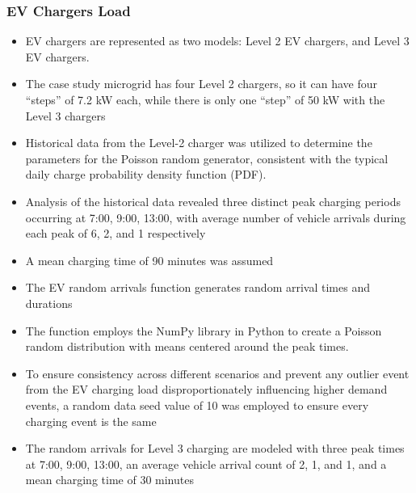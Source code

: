\documentclass[aspectratio=169, 8 pt]{beamer}
\begin{document}
	\begin{frame}
		\frametitle{EV Chargers Load}
		
		\begin{itemize} \large
			\item EV chargers are represented as two models: Level 2 EV chargers, and Level 3 EV chargers.
			\item The case study microgrid has four Level 2 chargers, so it can have four “steps” of 7.2 kW each, while there is only one “step” of 50 kW with the Level 3 chargers
			\item Historical data from the Level-2 charger was utilized to determine the parameters for the Poisson random generator, consistent with the typical daily charge probability density function (PDF).
			\item Analysis of the historical data revealed three distinct peak charging periods occurring at 7:00, 9:00, 13:00, with average number of vehicle arrivals during each peak of 6, 2, and 1 respectively
			\item A mean charging time of 90 minutes was assumed
			\item The EV random arrivals function generates random arrival times and durations
			\item The function employs the NumPy library in Python to create a Poisson random distribution with means centered around the peak times.
			\item To ensure consistency across different scenarios and prevent any outlier event from the EV charging load disproportionately influencing higher demand events, a random data seed value of 10 was employed to ensure every charging event is the same
			\item The random arrivals for Level 3 charging are modeled with three peak times at 7:00, 9:00, 13:00, an average vehicle arrival count of 2, 1, and 1, and a mean charging time of 30 minutes
		\end{itemize}
	\end{frame}
\end{document}
